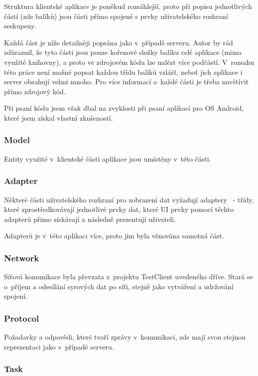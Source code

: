 \documentclass[thesis=B,czech]{FITthesis}[2013/10/20]
\begin{document}
Struktura klientské aplikace je poněkud rozsáhlejší, proto při popisu jednotlivých částí (zde balíků) jsou části přímo spojené s prvky uživatelského rozhraní seskupeny.

Každá část je níže detailněji popsána jako v~případě serveru. Autor by rád zdůraznil, že tyto části jsou pouze kořenové složky balíku celé aplikace (mimo využité knihovny), a proto ve zdrojovém kódu lze nalézt více podčástí. V~rozsahu této práce není možné popsat každou třídu balíků vzlášť, neboť jich aplikace i server obsahují velmi mnoho. Pro více informací o~každé části je třeba navštívit přímo zdrojový kód.

Při psaní kódu jsem však dbal na zvyklosti při psaní aplikací pro OS Android, které jsem získal vlastní zkušeností.

\subsubsection{Model}

Entity využité v~klientské části aplikace jsou umístěny v~této části.

\subsubsection{Adapter}

Některé části uživatelského rozhraní pro zobrazení dat vyžadují adaptery~\cite{adapter} - třídy, které zprostředkovávají jednotlivé prvky dat, které UI prvky pomocí těchto adapterů přimo získávají a následně prezentují uživateli. 

Adapterů je v~této aplikaci více, proto jim byla věnována samotná část.

\subsubsection{Network}

Síťová komunikace byla převzata z~projektu TestClient uvedeného dříve. Stará se o~příjem a odesílání syrových dat po síťi, stejně jako vytváření a udržování spojení.

\subsubsection{Protocol}

Požadavky a odpovědi, které tvoří zprávy v~komunikaci, zde mají svou stejnou reprezentaci jako v~případě serveru.

\subsubsection{Task}
\end{document}
